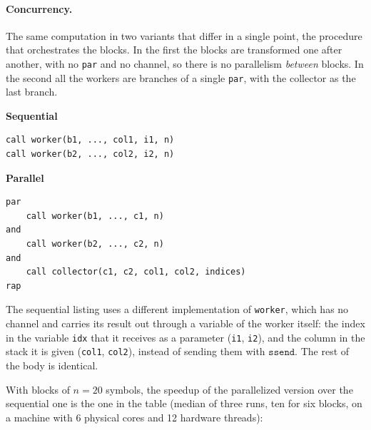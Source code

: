 \paragraph{Concurrency.} The same computation in two variants that differ in
a single point, the procedure that orchestrates the blocks. In the first the blocks
are transformed one after another, with no \texttt{par} and no channel, so
there is no parallelism \emph{between} blocks. In the second all the workers are
branches of a single \texttt{par}, with the collector as the last branch.
\begin{center}
\begin{minipage}[t]{0.48\textwidth}
\centering
\textbf{Sequential}
\begin{lstlisting}
call worker(b1, ..., col1, i1, n)
call worker(b2, ..., col2, i2, n)
\end{lstlisting}
\end{minipage}
\hfill
\begin{minipage}[t]{0.48\textwidth}
\centering
\textbf{Parallel}
\begin{lstlisting}
par
    call worker(b1, ..., c1, n)
and
    call worker(b2, ..., c2, n)
and
    call collector(c1, c2, col1, col2, indices)
rap
\end{lstlisting}
\end{minipage}
\end{center}

\noindent
The sequential listing uses a different implementation of \texttt{worker}, which has
no channel and carries its result out through a variable of the worker itself: the index in
the variable \texttt{idx} that it receives as a parameter (\texttt{i1}, \texttt{i2}), and
the column in the stack it is given (\texttt{col1}, \texttt{col2}), instead of sending
them with $\mathtt{ssend}$. The rest of the body is identical.

With blocks of $n=20$ symbols, the speedup of the parallelized version
over the sequential one is the one in the table (median of three
runs, ten for six blocks, on a machine with 6 physical cores and 12
hardware threads):

